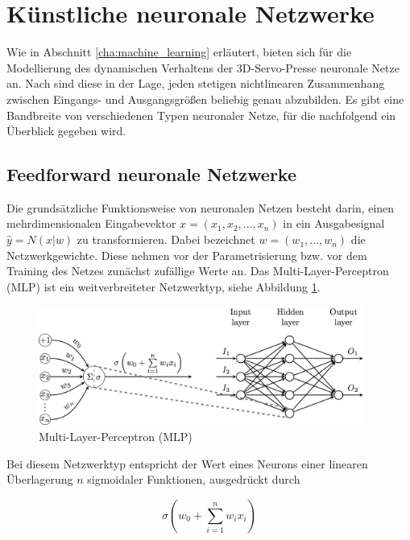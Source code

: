 \section{Künstliche neuronale Netzwerke}

Wie in Abschnitt \ref{cha:machine_learning} erläutert, bieten sich für die Modellierung des dynamischen Verhaltens der 3D-Servo-Presse neuronale Netze an. Nach \cite{Lipton.5292015} sind diese in der Lage, jeden stetigen nichtlinearen Zusammenhang zwischen Eingangs- und Ausgangsgrößen beliebig genau abzubilden. Es gibt eine Bandbreite von verschiedenen Typen neuronaler Netze, für die nachfolgend ein Überblick gegeben wird. 

\subsection{Feedforward neuronale Netzwerke}
\label{cha_ff}
Die grundsätzliche Funktionsweise von neuronalen Netzen besteht darin, einen mehrdimensionalen Eingabevektor $x = (x_1,x_2,...,x_n)$ in ein Ausgabesignal $\hat{y} = N(x|w)$ zu transformieren. Dabei bezeichnet $w = (w_1,...,w_n)$ die Netzwerkgewichte. Diese nehmen vor der Parametrisierung bzw. vor dem Training des Netzes zunächst zufällige Werte an. Das Multi-Layer-Perceptron (MLP) ist ein weitverbreiteter Netzwerktyp, siehe Abbildung \ref{fig:mlp}. 

\begin{figure} 
	\centering
	\includegraphics[width=0.95\textwidth]{images/MLP}
	\caption{Multi-Layer-Perceptron (MLP) \cite{Velickovic.2018}}
	\label{fig:mlp}
\end{figure}


Bei diesem Netzwerktyp entspricht der Wert eines Neurons einer linearen Überlagerung $n$ sigmoidaler Funktionen, ausgedrückt durch 

\begin{equation} 
\label{eq:feedforward}
\sigma(w_0 + \sum_{i=1}^{n} w_i x_i)
\end{equation}

